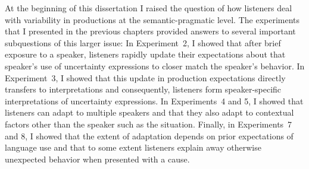 

At the beginning of this dissertation I raised the question of how listeners deal with variability in productions at the semantic-pragmatic level. The experiments that I presented in the previous chapters provided answers to several important subquestions of this larger issue: In Experiment~2, I showed that after brief exposure to a speaker, listeners rapidly update their expectations about that speaker's use of uncertainty expressions to closer match the speaker's behavior. In Experiment~3, I showed that this update in production expectations directly transfers to interpretations and consequently, listeners form speaker-specific interpretations of uncertainty expressions. In Experiments~4 and 5, I showed that listeners can adapt to multiple speakers and that they also adapt to contextual factors other than the speaker such as the situation. Finally, in Experiments~7 and 8, I showed that the extent of adaptation depends on prior expectations of language use and that to some extent listeners explain away otherwise unexpected behavior when presented with a cause.


